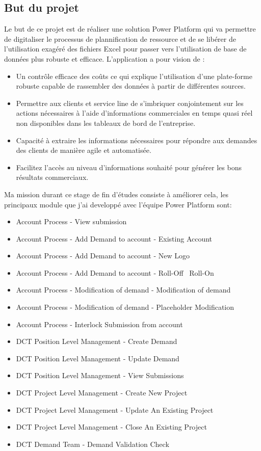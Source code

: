 \subsection{But du projet}

Le but de ce projet est de réaliser une solution Power Platform qui va permettre de digitaliser le processus de plannification de ressource et de se libérer de l’utilisation exagéré des fichiers Excel pour passer vers l’utilisation de base de données plus robuste et efficace. L’application a pour vision de :  
\\

\begin{itemize}
  \item Un contrôle efficace des coûts ce qui explique l'utilisation d'une plate-forme robuste capable de rassembler des données à partir de différentes sources.
  \item Permettre aux clients et service line de s'imbriquer conjointement sur les actions nécessaires à l'aide d'informations commerciales en temps quasi réel non disponibles dans les tableaux de bord de l'entreprise.
  \item Capacité à extraire les informations nécessaires pour répondre aux demandes des clients de manière agile et automatisée.
  \item Facilitez l'accès au niveau d'informations souhaité pour générer les bons résultats commerciaux.
\end{itemize}

Ma mission durant ce stage de fin d’études consiste à améliorer cela, les principaux module que j'ai developpé avec l'équipe Power Platform sont:
\\
\begin{itemize}
  \item Account Process - View submission
  \item Account Process - Add Demand to account - Existing Account
  \item Account Process - Add Demand to account - New Logo
  \item Account Process - Add Demand to account - Roll-Off \ Roll-On
  \item Account Process - Modification of demand - Modification of demand
  \item Account Process - Modification of demand - Placeholder Modification
  \item Account Process - Interlock Submission from account 
  \item DCT Position Level Management - Create Demand
  \item DCT Position Level Management - Update Demand
  \item DCT Position Level Management - View Submissions
  \item DCT Project Level Management - Create New Project
  \item DCT Project Level Management - Update An Existing Project
  \item DCT Project Level Management - Close An Existing Project
  \item DCT Demand Team - Demand Validation Check
\end{itemize}

